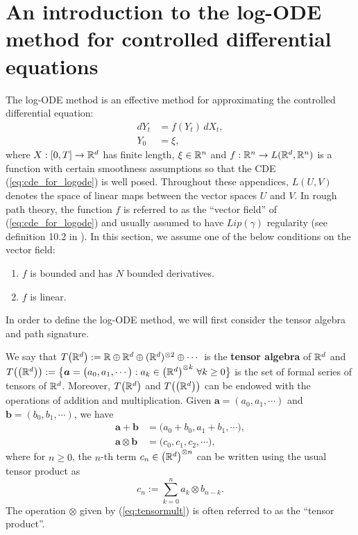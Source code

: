 \section{An introduction to the log-ODE method for controlled differential equations}\label{apx:logode}

The log-ODE method is an effective method for approximating the controlled differential equation:
\begin{align}
dY_t & = f(Y_t)\,dX_t,
\label{eq:cde_for_logode}\\[3pt]
Y_0 & = \xi,\nonumber
\end{align}
where $X : [0,T]\rightarrow \mathbb{R}^d$ has finite length, $\xi\in\mathbb{R}^n$ and $f : \mathbb{R}^n \rightarrow L(\mathbb{R}^d, \mathbb{R}^n)$ is a function with certain smoothness assumptions so that the CDE (\ref{eq:cde_for_logode}) is well posed. Throughout these appendices, $L(U, V)$ denotes the space of linear maps between the vector spaces $U$ and $V$. In rough path theory, the function $f$ is referred to as the ``vector field'' of (\ref{eq:cde_for_logode}) and usually assumed to have $Lip(\gamma)$ regularity
(see definition 10.2 in \cite{friz2010multidimensional}). In this section, we assume one of the below conditions on the vector field:
\begin{enumerate}
\item $f$ is bounded and has $N$ bounded derivatives.
\item $f$ is linear.
\end{enumerate}

In order to define the log-ODE method, we will first consider the tensor algebra and path signature.\smallbreak

\begin{definition}\label{def:tensoralgebras}
We say that $T\big(\mathbb{R}^d\big):= \mathbb{R} \oplus \mathbb{R}^d \oplus (\mathbb{R}^d)^{\otimes 2}\oplus\cdots$ is the \textbf{tensor algebra} of $\mathbb{R}^d$ and $T\big(\big(\mathbb{R}^d\big)\big):=\big\{\boldsymbol{a} = \big(a_{0}, a_{1}, \cdots\big) : a_{k}\in\big(\mathbb{R}^d\big)^{\otimes k}\,\,\forall k\geq 0\big\}$ is the set of formal series of tensors of $\mathbb{R}^d$.
Moreover, $T\big(\mathbb{R}^d\big)$ and $T\big(\big(\mathbb{R}^d\big)\big)$ can be endowed with the operations
of addition and multiplication.
Given $\boldsymbol{a} = (a_{0}, a_{1}, \cdots)$ and $\boldsymbol{b} = (b_{0}, b_{1}, \cdots)$, we have
\begin{align}
\boldsymbol{a} + \boldsymbol{b} & =\big(a_{0} + b_{0}, a_{1} + b_{1}, \cdots\big),\label{eq:tensoradd}\\
\boldsymbol{a} \otimes \boldsymbol{b} & =\big(c_{0}, c_{1}, c_{2}, \cdots\big),\label{eq:tensormult}
\end{align}
where for $n\geq 0$, the $n$-th term $c_{n}\in\big(\mathbb{R}^d\big)^{\otimes n}$ can be written using the usual tensor product as
\begin{equation}
c_{n} := \sum_{k=0}^{n}a_{k}\otimes b_{n-k}.\nonumber
\end{equation}
The operation $\otimes$ given by (\ref{eq:tensormult}) is often referred to as the ``tensor product''.
\end{definition}\medbreak

